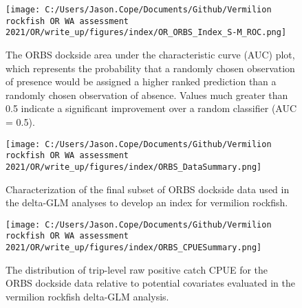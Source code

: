 \documentclass[11pt,
  english,
  a4paper,
]{article}
\begin{document}
\begin{figure}
\centering
\texttt{[image: C:/Users/Jason.Cope/Documents/Github/Vermilion rockfish OR WA assessment 2021/OR/write\_up/figures/index/OR\_ORBS\_Index\_S-M\_ROC.png]}
\caption{The ORBS dockside area under the characteristic curve (AUC) plot, which represents the probability that a randomly chosen observation of presence would be assigned a higher ranked prediction than a randomly chosen observation of absence. Values much greater than 0.5 indicate a significant improvement over a random classifier (AUC = 0.5).\label{fig:OR-ORBS-Index-S-M-ROC}}
\end{figure}

\tagmcend\tagstructend


\begin{figure}
\centering
\texttt{[image: C:/Users/Jason.Cope/Documents/Github/Vermilion rockfish OR WA assessment 2021/OR/write\_up/figures/index/ORBS\_DataSummary.png]}
\caption{Characterization of the final subset of ORBS dockside data used in the delta-GLM analyses to develop an index for vermilion rockfish.\label{fig:ORBS-DataSummary}}
\end{figure}

\tagmcend\tagstructend


\begin{figure}
\centering
\texttt{[image: C:/Users/Jason.Cope/Documents/Github/Vermilion rockfish OR WA assessment 2021/OR/write\_up/figures/index/ORBS\_CPUESummary.png]}
\caption{The distribution of trip-level raw positive catch CPUE for the ORBS dockside data relative to potential covariates evaluated in the vermilion rockfish delta-GLM analysis.\label{fig:ORBS-CPUESummary}}
\end{figure}

\tagmcend\tagstructend

\end{document}
